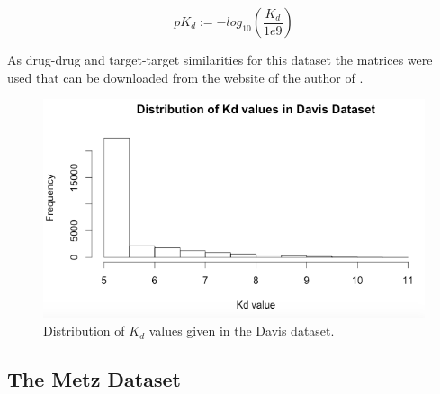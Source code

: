 \begin{equation}
pK_d:= -log_{10}(\frac{K_d}{1e9})
\end{equation}

As drug-drug and target-target similarities for this dataset the matrices were used that can be downloaded from the website of the author of \cite{pahikkala2014toward}.

\begin{figure}
\begin{center}
\includegraphics[scale=0.6]{davis_dist.png}
\end{center}
\caption{Distribution of $K_d$ values given in the Davis dataset.}
\label{fig:numStructure}
\end{figure}

\subsection{The Metz Dataset}

